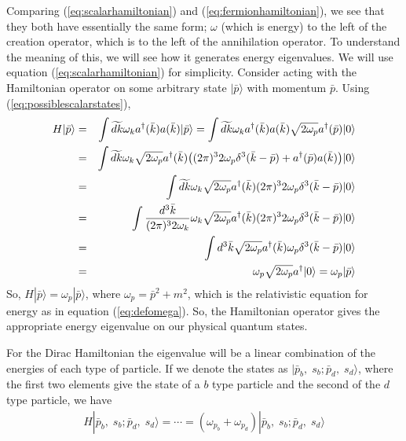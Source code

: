 \documentclass[12pt,epsf]{article}
\def\nolabel{\nonumber }
\def\nolabel{\nonumber }
\begin{document}
Comparing (\ref{eq:scalarhamiltonian}) and
(\ref{eq:fermionhamiltonian}), we see that they both have essentially
the same form; $\omega$ (which is energy) to the left of the creation
operator, which is to the left of the annihilation operator.  To
understand the meaning of this, we will see how it generates energy
eigenvalues.  We will use equation (\ref{eq:scalarhamiltonian}) for
simplicity.  Consider acting with the Hamiltonian operator on some
arbitrary state $|\bar p\rangle$ with momentum $\bar p$.  Using
(\ref{eq:possiblescalarstates}), 
\begin{eqnarray}
H|\bar p\rangle &=& \int \widetilde{dk}\omega_ka^{\dagger}(\bar
k)a(\bar k)|\bar p\rangle = \int \widetilde{dk}\omega_k
a^{\dagger}(\bar k)a(\bar k)\sqrt{2\omega_p}a^{\dagger}(\bar
p)|0\rangle \nolabel \\
&=& \int \widetilde{dk}\omega_k \sqrt{2\omega_p}a^{\dagger} (\bar k)
\big((2\pi)^3 2\omega_p\delta^3(\bar k - \bar p) + a^{\dagger}(\bar
p)a(\bar k)\big)|0\rangle \nolabel \\
&=& \int \widetilde{dk} \omega_k\sqrt{2\omega_p}a^{\dagger}(\bar
k)(2\pi)^32\omega_p\delta^3(\bar k - \bar p)|0\rangle \nolabel \\
&=& \int {d^3\bar k \over (2\pi)^3 2\omega_k} \omega_k
\sqrt{2\omega_p}a^{\dagger}(\bar k)(2\pi)^32\omega_p \delta^3(\bar k -
\bar p)|0\rangle \nolabel \\
&=& \int d^3\bar k \sqrt{2\omega_p}a^{\dagger}(\bar k )\omega_p
\delta^3(\bar k - \bar p)|0\rangle \nolabel \\
&=& \omega_p \sqrt{2\omega_p}a^{\dagger}|0\rangle = \omega_p|\bar
p\rangle\nolabel
\end{eqnarray}
So, $H|\bar p\rangle = \omega_p|\bar p\rangle$, where $\omega_p = \bar
p^2 + m^2$, which is the relativistic equation for energy as in
equation (\ref{eq:defomega}).  So, the Hamiltonian operator gives the
appropriate energy eigenvalue on our physical quantum states.  

For the Dirac Hamiltonian the eigenvalue will be a linear combination
of the energies of each type of particle.  If we denote the states as
$|\bar p_b, \; s_b ; \bar p_d, \; s_d \rangle$, where the first two
elements give the state of a $b$ type particle and the second of the
$d$ type particle, we have 
\begin{eqnarray}
H|\bar p_b, \; s_b ; \bar p_d, \; s_d \rangle = \cdots =
(\omega_{p_b}+\omega_{p_d})|\bar p_b, \; s_b ; \bar p_d, \; s_d
\rangle\nolabel
\end{eqnarray}
\end{document}
